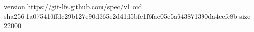 version https://git-lfs.github.com/spec/v1
oid sha256:1a075410ffdc29b127e90d365e2d41d5bfe1f6fae05e5a643871390da4ccfc8b
size 22000
